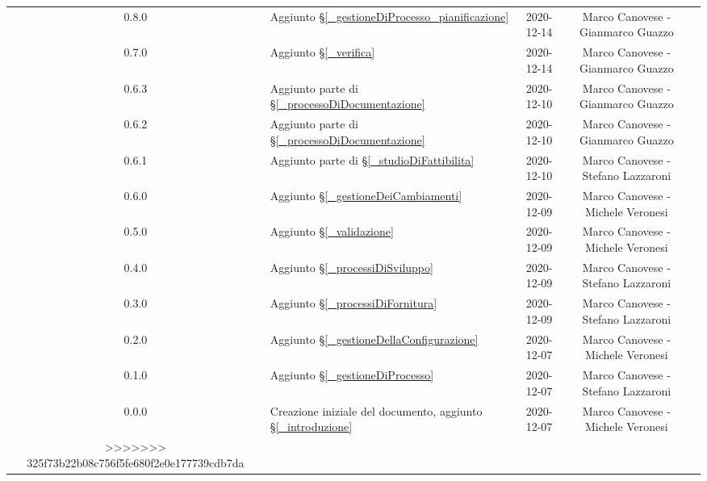 \begin{center}
\begin{longtable}{|c|p{5cm}|c|c|c|}
		0.8.0 & Aggiunto \S\ref{_gestioneDiProcesso_pianificazione} & 2020-12-14 & Marco Canovese - Gianmarco Guazzo \\
		0.7.0 & Aggiunto \S\ref{_verifica} & 2020-12-14& Marco Canovese - Gianmarco Guazzo \\
		0.6.3 & Aggiunto parte di \S\ref{_processoDiDocumentazione} & 2020-12-10 & Marco Canovese - Gianmarco Guazzo \\
		0.6.2 & Aggiunto parte di \S\ref{_processoDiDocumentazione} & 2020-12-10 & Marco Canovese - Gianmarco Guazzo \\
		0.6.1 & Aggiunto parte di \S\ref{_studioDiFattibilita} & 2020-12-10 & Marco Canovese - Stefano Lazzaroni  \\
		0.6.0 & Aggiunto \S\ref{_gestioneDeiCambiamenti} & 2020-12-09 & Marco Canovese - Michele Veronesi \\
		0.5.0 & Aggiunto \S\ref{_validazione} & 2020-12-09 & Marco Canovese - Michele Veronesi  \\
		0.4.0 & Aggiunto \S\ref{_processiDiSviluppo} & 2020-12-09 & Marco Canovese - Stefano Lazzaroni  \\
		0.3.0 & Aggiunto \S\ref{_processiDiFornitura} & 2020-12-09 & Marco Canovese - Stefano Lazzaroni \\
		0.2.0 & Aggiunto \S\ref{_gestioneDellaConfigurazione} & 2020-12-07 & Marco Canovese - Michele Veronesi  \\
		0.1.0 & Aggiunto \S\ref{_gestioneDiProcesso} & 2020-12-07 & Marco Canovese - Stefano Lazzaroni \\
		0.0.0 & Creazione iniziale del documento, aggiunto \S\ref{_introduzione} & 2020-12-07 & Marco Canovese - Michele Veronesi \\
>>>>>>> 325f73b22b08c756f5fe680f2e0e177739cdb7da
		
		\hline
	\end{longtable}
\end{center}